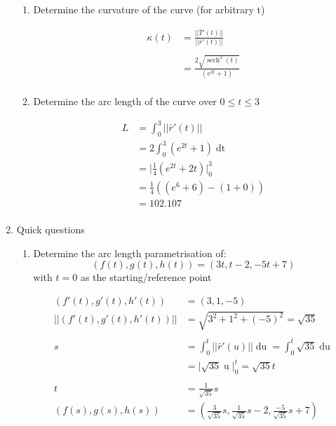 \documentclass[a4paper,11pt]{article}
\begin{document}
\begin{preview}
\begin{enumerate}
\begin{enumerate}
        \item  Determine the curvature of the curve (for arbitrary t)
        
        \begin{align*}
            \kappa(t) &= \frac{|| \bar{T}'(t) ||}{|| \bar{r}'(t) ||}\\\\
            &= \frac{2 \sqrt{\operatorname{sech}^2(t)}}{(e^{2t}+1)} \\
        \end{align*}

        \item  Determine the arc length of the curve over $ 0 \leq t \leq 3 $
        
        \begin{align*}
            L &= \int_{0}^{3} || \bar{r}'(t) ||\\
              &= 2 \int_{0}^{3} (e^{2t}+1) \operatorname{dt}\\
              &= \Big| \frac{1}{4}(e^{2t} + 2t) \Big|^3_0\\
              &= \frac{1}{4}((e^6 + 6) - (1+0))\\
              &= 102.107\\
        \end{align*}

    \end{enumerate}

    \item  Quick questions
    
    \begin{enumerate}
        \item Determine the arc length parametrisation of:
        $$ (f(t),g(t),h(t)) = (3t,t-2,-5t+7) $$
        with $t = 0$ as the starting/reference point

        \begin{align*}
            \left(f'(t), g'(t), h'(t)\right) &= \left( 3, 1, -5 \right)\\
            ||\left(f'(t), g'(t), h'(t)\right)|| &= \sqrt{3^2 + 1^2 + (-5)^2}=\sqrt{35}\\\\
            s &= \int^t_0 || \bar{r}'(u) || \operatorname{du} = \int^t_0 \sqrt{35} \operatorname{du}\\
            &= \Big| \sqrt{35}\operatorname{u} \Big|^t_0 = \sqrt{35}t\\\\
            t &= \frac{1}{\sqrt{35}}s\\
            (f(s),g(s),h(s)) &= \left( \frac{3}{\sqrt{35}}s, \frac{1}{\sqrt{35}}s -2, \frac{-5}{\sqrt{35}}s +7 \right)\\
        \end{align*}


\end{enumerate}
\end{enumerate}
\end{preview}
\end{document}
